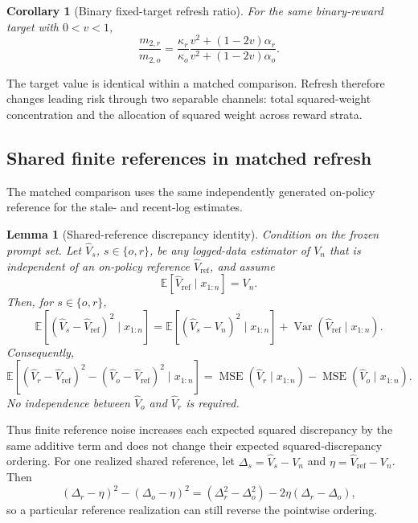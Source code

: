 \documentclass[10pt]{article}
\newtheorem{corollary}{Corollary}
\newtheorem{lemma}{Lemma}
\theoremstyle{remark}
\newcommand{\E}{\mathbb{E}}
\newcommand{\Var}{\operatorname{Var}}
\begin{document}
\begin{corollary}[Binary fixed-target refresh ratio]
For the same binary-reward target with $0<v<1$,
\begin{equation}
\frac{m_{2,r}}{m_{2,o}}=\frac{\kappa_r}{\kappa_o}
\frac{v^2+(1-2v)\alpha_r}{v^2+(1-2v)\alpha_o}.
\end{equation}
\end{corollary}
The target value is identical within a matched comparison. Refresh therefore changes leading risk through two separable channels: total squared-weight concentration and the allocation of squared weight across reward strata.

\subsection{Shared finite references in matched refresh}
The matched comparison uses the same independently generated on-policy reference for the stale- and recent-log estimates.

\begin{lemma}[Shared-reference discrepancy identity]
Condition on the frozen prompt set. Let $\widehat V_s$, $s\in\{o,r\}$, be any logged-data estimator of $V_n$ that is independent of an on-policy reference $\widehat V_{\mathrm{ref}}$, and assume
\begin{equation}
\E[\widehat V_{\mathrm{ref}}\mid x_{1:n}]=V_n.
\end{equation}
Then, for $s\in\{o,r\}$,
\begin{equation}
\E[(\widehat V_s-\widehat V_{\mathrm{ref}})^2\mid x_{1:n}]
=\E[(\widehat V_s-V_n)^2\mid x_{1:n}]+\Var(\widehat V_{\mathrm{ref}}\mid x_{1:n}).
\end{equation}
Consequently,
\begin{equation}
\E[(\widehat V_r-\widehat V_{\mathrm{ref}})^2-(\widehat V_o-\widehat V_{\mathrm{ref}})^2\mid x_{1:n}]
=\operatorname{MSE}(\widehat V_r\mid x_{1:n})-\operatorname{MSE}(\widehat V_o\mid x_{1:n}).
\end{equation}
No independence between $\widehat V_o$ and $\widehat V_r$ is required.
\end{lemma}
Thus finite reference noise increases each expected squared discrepancy by the same additive term and does not change their expected squared-discrepancy ordering. For one realized shared reference, let $\Delta_s=\widehat V_s-V_n$ and $\eta=\widehat V_{\mathrm{ref}}-V_n$. Then
\begin{equation}
(\Delta_r-\eta)^2-(\Delta_o-\eta)^2=(\Delta_r^2-\Delta_o^2)-2\eta(\Delta_r-\Delta_o),
\end{equation}
so a particular reference realization can still reverse the pointwise ordering.
\end{document}
